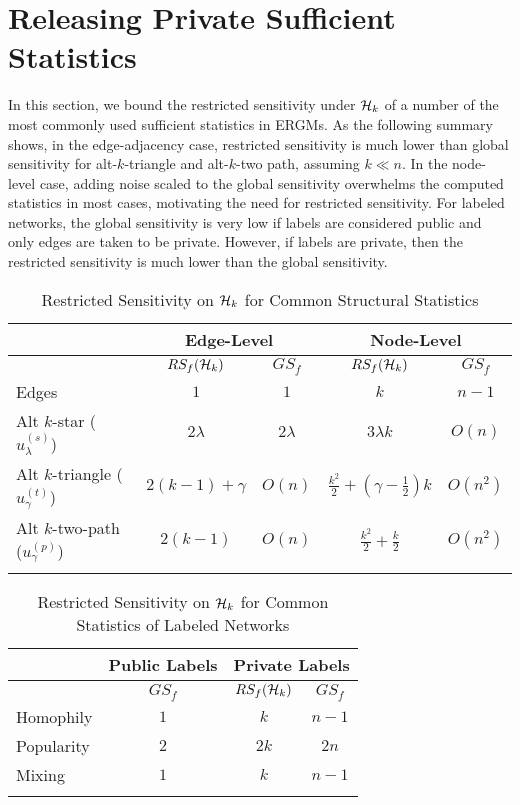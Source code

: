 \section{Releasing Private Sufficient Statistics}
\label{sec:release_suff_stats}

In this section, we bound the restricted sensitivity under $\mathcal{H}_{k}$ of a number of the most commonly used sufficient statistics in ERGMs. As the following summary shows, in the edge-adjacency case, restricted sensitivity is much lower than global sensitivity for alt-$k$-triangle and alt-$k$-two path, assuming $k \ll n$. In the node-level case, adding noise scaled to the global sensitivity overwhelms the computed statistics in most cases, motivating the need for restricted sensitivity. For labeled networks, the global sensitivity is very low if labels are considered public and only edges are taken to be private. However, if labels are private, then the restricted sensitivity is much lower than the global sensitivity. 

\begin{table}[!ht]
	\caption{Restricted Sensitivity on $\mathcal{H}_k$ for Common Structural Statistics}
	\begin{center}
	\begin{tabular}{|l|c|c|c|c|}
		\hhline{|=====|}
		 & \multicolumn{2}{c|}{Edge-Level} & \multicolumn{2}{c|}{Node-Level} \\\hline
		& $RS_f(\mathcal{H}_k)$ & $GS_f$ & $RS_f(\mathcal{H}_k)$ & $GS_f$ \\ \hline
		Edges & $1$ & $1$ & $k$  & $n-1$\\ \hline
		Alt $k$-star ($u_\lambda^{(s)}$) & $2\lambda$ & $2\lambda$  & $3 \lambda k$  & $O(n)$\\ \hline
		Alt $k$-triangle  ($u_\gamma^{(t)}$)  & $2(k-1) + \gamma$ & $O(n)$  & $\frac{k^2}{2} +  \left(\gamma - \frac{1}{2}\right)k$  & $O(n^2)$\\ \hline
		Alt $k$-two-path  ($u_\gamma^{(p)}$)  & $2(k-1)$ & $O(n)$    & $\frac{k^2}{2} + \frac{k}{2}$ & $O(n^2)$\\	
		\hhline{|=====|}
	\end{tabular}
	\end{center}
	\label{tab:altsuffstatsrestr}
\end{table}

\begin{table}[!ht]
		\caption{Restricted Sensitivity on $\mathcal{H}_k$ for Common Statistics of Labeled Networks}
		\begin{center}
		\begin{tabular}{|l|c|c|c|}
		\hhline{|====|}
		& \multicolumn{1}{c|}{Public Labels} & \multicolumn{2}{c|}{Private Labels} \\\hline
		 & $GS_f$ & $RS_f(\mathcal{H}_k)$ & $GS_f$ \\ \hline
		Homophily &  $1$ & $k$  & $n-1$\\ \hline
		Popularity  & $2$  & $2k$ & $2n$\\ \hline
		Mixing & $1$    & $k$ & $n-1$\\	 \hhline{|====|}
	\end{tabular}
	\label{tab:labeluffstatsrestr}
	\end{center}
\end{table}

